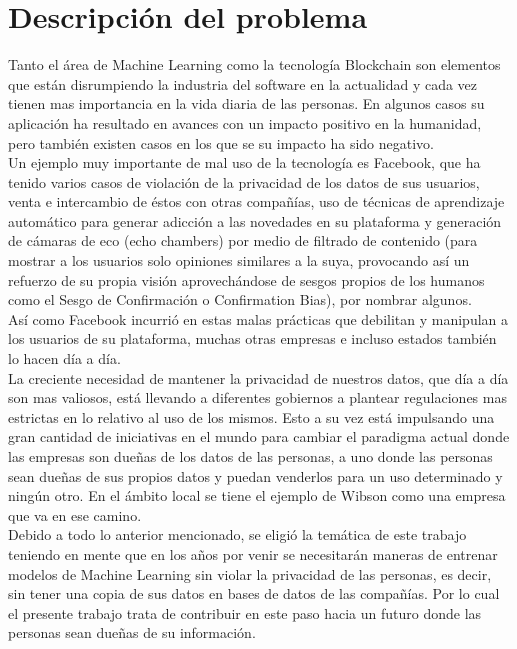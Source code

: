\documentclass[
11pt, %
oneside, %
spanish, %
singlespacing, %
headsepline, %
chapterinoneline, %
]{MastersDoctoralThesis} %
\begin{document}
\chapter{Descripci\'on del problema}

Tanto el área de Machine Learning como la tecnología Blockchain son elementos que están disrumpiendo la industria del software en la actualidad y cada vez tienen mas importancia en la vida diaria de las personas. En algunos casos su aplicación ha resultado en avances con un impacto positivo en la humanidad, pero también existen casos en los que se su impacto ha sido negativo. \\

Un ejemplo muy importante de mal uso de la tecnología es Facebook, que ha tenido varios casos de violación de la privacidad de los datos de sus usuarios, venta e intercambio de éstos con otras compañías, uso de técnicas de aprendizaje automático para generar adicción a las novedades en su plataforma y generación de cámaras de eco (echo chambers) por medio de filtrado de contenido (para mostrar a los usuarios solo opiniones similares a la suya, provocando así un refuerzo de su propia visión aprovechándose de sesgos propios de los humanos como el Sesgo de Confirmación o Confirmation Bias), por nombrar algunos. \\

Así como Facebook incurrió en estas malas prácticas que debilitan y manipulan a los usuarios de su plataforma, muchas otras empresas e incluso estados también lo hacen día a día. \\

La creciente necesidad de mantener la privacidad de nuestros datos, que día a día son mas valiosos, está llevando a diferentes gobiernos a plantear regulaciones mas estrictas en lo relativo al uso de los mismos.
Esto a su vez está impulsando una gran cantidad de iniciativas en el mundo para cambiar el paradigma actual donde las empresas son dueñas de los datos de las personas, a uno donde las personas sean dueñas de sus propios datos y puedan venderlos para un uso determinado y ningún otro. En el ámbito local se tiene el ejemplo de Wibson como una empresa que va en ese camino. \\

Debido a todo lo anterior mencionado, se eligió la temática de este trabajo teniendo en mente que en los años por venir se necesitarán maneras de entrenar modelos de Machine Learning sin violar la privacidad de las personas, es decir, sin tener una copia de sus datos en bases de datos de las compañías. Por lo cual el presente trabajo trata de contribuir en este paso hacia un futuro donde las personas sean dueñas de su información. 
\end{document}
